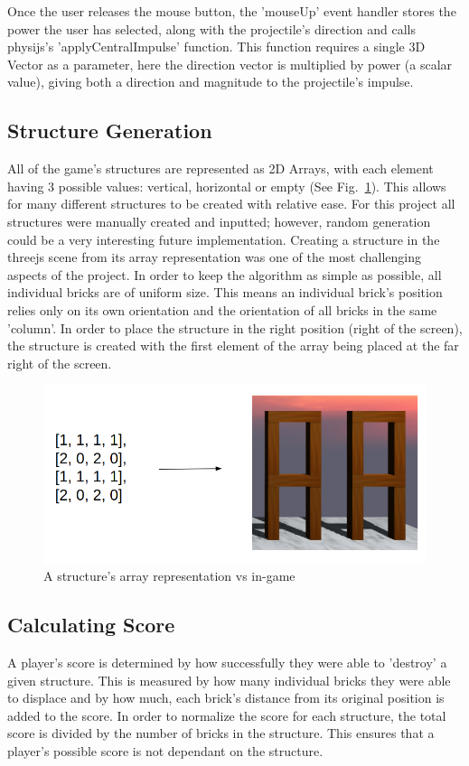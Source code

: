 \documentclass[runningheads]{llncs}
\begin{document}
	Once the user releases the mouse button, the 'mouseUp' event handler stores the power the user has selected, along with the projectile's direction and calls physijs's 'applyCentralImpulse' function. This function requires a single 3D Vector as a parameter, here the direction vector is multiplied by power (a scalar value), giving both a direction and magnitude to the projectile's impulse.
	\subsection{Structure Generation}
	All of the game's structures are represented as 2D Arrays, with each element having 3 possible values: vertical, horizontal or empty (See Fig.~\ref{structure}). This allows for many different structures to be created with relative ease. For this project all structures were manually created and inputted; however, random generation could be a very interesting future implementation. Creating a structure in the threejs scene from its array representation was one of the most challenging aspects of the project. In order to keep the algorithm as simple as possible, all individual bricks are of uniform size. This means an individual brick's position relies only on its own orientation and the orientation of all bricks in the same 'column'. In order to place the structure in the right position (right of the screen), the structure is created with the first element of the array being placed at the far right of the screen. 
	\begin{figure}
		\centering
		\includegraphics[width=\textwidth]{./img/structure.png}
		\caption{A structure's array representation vs in-game}
		\label{structure}
	\end{figure}
		
	\subsection{Calculating Score}
	A player's score is determined by how successfully they were able to 'destroy' a given structure. This is measured by how many individual bricks they were able to displace and by how much, each brick's distance from its original position  is added to the score. In order to normalize the score for each structure, the total score is divided by the number of bricks in the structure. This ensures that a player's possible score is not dependant on the structure.
	
\end{document}
